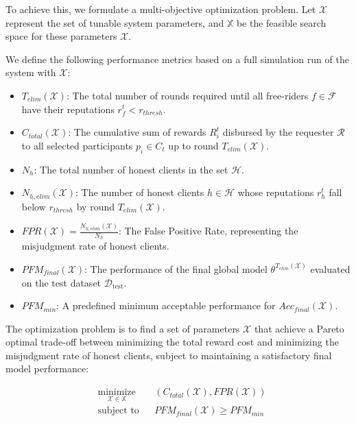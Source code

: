 \documentclass[conference]{IEEEtran}
\begin{document}
To achieve this, we formulate a multi-objective optimization problem. 
Let $\mathcal{X}$ represent the set of tunable system parameters, and $\mathbb{X}$ be the feasible search space for these parameters $\mathcal{X}$.

We define the following performance metrics based on a full simulation run of the system with $\mathcal{X}$:
\begin{itemize}
    \item $T_{elim}(\mathcal{X})$: The total number of rounds required until all free-riders $f \in \mathcal{F}$ have their reputations $r_f^t < r_{thresh}$.
    \item $C_{total}(\mathcal{X})$: The cumulative sum of rewards $R_i^t$ disbursed by the requester $\mathcal{R}$ to all selected participants $p_i \in C_t$ up to round $T_{elim}(\mathcal{X})$.
    \item $N_h$: The total number of honest clients in the set $\mathcal{H}$.
    \item $N_{h,elim}(\mathcal{X})$: The number of honest clients $h \in \mathcal{H}$ whose reputations $r_h^t$ fall below $r_{thresh}$ by round $T_{elim}(\mathcal{X})$.
    \item $FPR(\mathcal{X}) = \frac{N_{h,elim}(\mathcal{X})}{N_h}$: The False Positive Rate, representing the misjudgment rate of honest clients.
    \item $PFM_{final}(\mathcal{X})$: The performance of the final global model $\theta^{T_{elim}(\mathcal{X})}$ evaluated on the test dataset $\mathcal{D}_{\text{test}}$.
    \item $PFM_{min}$: A predefined minimum acceptable performance for $Acc_{final}(\mathcal{X})$.
\end{itemize}

The optimization problem is to find a set of parameters $\mathcal{X}$ that achieve a Pareto optimal trade-off between minimizing the total reward cost and minimizing the misjudgment rate of honest clients, subject to maintaining a satisfactory final model performance:

\begin{equation}
    \begin{aligned}
    & \underset{\mathcal{X} \in \mathbb{X}}{\text{minimize}}
    & & \left( C_{total}(\mathcal{X}), FPR(\mathcal{X}) \right) \\
    & \text{subject to}
    & & PFM_{final}(\mathcal{X}) \ge PFM_{min}
    \end{aligned}
\end{equation}
\end{document}
